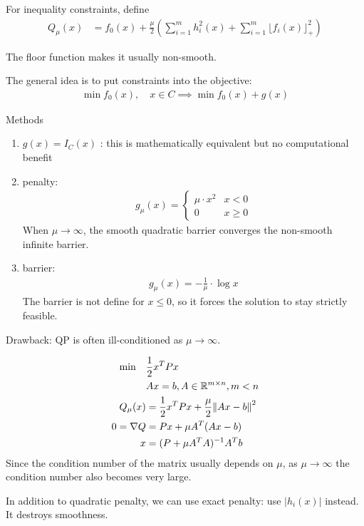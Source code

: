 \documentclass[class=article,crop=false]{standalone}
\begin{document}
For inequality constraints, define
\begin{align*}
	Q_{\mu}(x) &= f_0(x) + \frac{\mu}{2} \left( \sum_{ i= 1}^{ m} h_i^2(x) + \sum_{ i= 1}^{ m} \lfloor f_i(x) \rfloor_{+}^2 \right) 
\end{align*}
\begin{note}
The floor function makes it usually non-smooth.
\end{note}
\begin{remark}
The general idea is to put constraints into the objective:
\begin{align*}
	\min f_0(x), \quad x \in C \implies \min f_0(x) + g(x)
\end{align*}
\end{remark}
Methods
\begin{enumerate}[label=(\arabic*)]
	\item $ g(x) = I_{C}(x)$ : this is mathematically equivalent but no computational benefit
	\item penalty: 
		\begin{align*}
			g_{\mu}(x) =
			\begin{cases}
				\mu \cdot x^2 & x<0\\
				0 & x\geq 0
			\end{cases}
		\end{align*}
		When $ \mu \to \infty$, the smooth quadratic barrier converges the non-smooth infinite barrier.
	\item barrier:
		\begin{align*}
			g_{\mu}(x) = -\frac{1}{\mu} \cdot \log x
		\end{align*}
		The barrier is not define for $ x\leq 0$, so it forces the solution to stay strictly feasible.
\end{enumerate}

\begin{remark}
Drawback: QP is often ill-conditioned as $ \mu \to \infty$.
\end{remark}
\begin{eg}
\begin{align*}
\min\quad &\frac{1}{2} x^{T}Px \\
&Ax=b, A \in \mathbb{R}^{m\times n}, m<n\\
Q_{\mu}(x) &= \frac{1}{2} x^{T}Px + \frac{\mu}{2} {\left\lVert{ Ax-b}\right\rVert}^2\\ 
0 = \nabla Q &= Px + \mu A^{T}(Ax-b) \\
x&= (P+ \mu A^{T}A)^{-1} A^{T}b
\end{align*}
Since the condition number of the matrix usually depends on $ \mu$, as $ \mu \to \infty$ the condition number also becomes very large.
\end{eg}

In addition to quadratic penalty, we can use exact penalty: use $ |h_i(x)|$ instead. It destroys smoothness.
\end{document}
